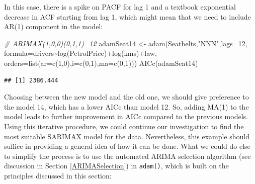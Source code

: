 \documentclass[
]{book}
\newenvironment{Shaded}{\begin{snugshade}}{\end{snugshade}}
\newcommand{\AttributeTok}[1]{\textcolor[rgb]{0.77,0.63,0.00}{#1}}
\newcommand{\CommentTok}[1]{\textcolor[rgb]{0.56,0.35,0.01}{\textit{#1}}}
\newcommand{\ConstantTok}[1]{\textcolor[rgb]{0.00,0.00,0.00}{#1}}
\newcommand{\DecValTok}[1]{\textcolor[rgb]{0.00,0.00,0.81}{#1}}
\newcommand{\FunctionTok}[1]{\textcolor[rgb]{0.00,0.00,0.00}{#1}}
\newcommand{\NormalTok}[1]{#1}
\newcommand{\OtherTok}[1]{\textcolor[rgb]{0.56,0.35,0.01}{#1}}
\newcommand{\SpecialCharTok}[1]{\textcolor[rgb]{0.00,0.00,0.00}{#1}}
\newcommand{\StringTok}[1]{\textcolor[rgb]{0.31,0.60,0.02}{#1}}
\theoremstyle{definition}
\theoremstyle{definition}
\theoremstyle{definition}
\theoremstyle{definition}
\theoremstyle{remark}
\begin{document}
In this case, there is a spike on PACF for lag 1 and a textbook exponential decrease in ACF starting from lag 1, which might mean that we need to include AR(1) component in the model:

\begin{Shaded}
\begin{Highlighting}[]
\CommentTok{\# ARIMAX(1,0,0)(0,1,1)\_12}
\NormalTok{adamSeat14 }\OtherTok{\textless{}{-}} \FunctionTok{adam}\NormalTok{(Seatbelts,}\StringTok{"NNN"}\NormalTok{,}\AttributeTok{lags=}\DecValTok{12}\NormalTok{,}
                   \AttributeTok{formula=}\NormalTok{drivers}\SpecialCharTok{\textasciitilde{}}\FunctionTok{log}\NormalTok{(PetrolPrice)}\SpecialCharTok{+}\FunctionTok{log}\NormalTok{(kms)}\SpecialCharTok{+}\NormalTok{law,}
                   \AttributeTok{orders=}\FunctionTok{list}\NormalTok{(}\AttributeTok{ar=}\FunctionTok{c}\NormalTok{(}\DecValTok{1}\NormalTok{,}\DecValTok{0}\NormalTok{),}\AttributeTok{i=}\FunctionTok{c}\NormalTok{(}\DecValTok{0}\NormalTok{,}\DecValTok{1}\NormalTok{),}\AttributeTok{ma=}\FunctionTok{c}\NormalTok{(}\DecValTok{0}\NormalTok{,}\DecValTok{1}\NormalTok{)))}
\FunctionTok{AICc}\NormalTok{(adamSeat14)}
\end{Highlighting}
\end{Shaded}

\begin{verbatim}
## [1] 2386.444
\end{verbatim}

Choosing between the new model and the old one, we should give preference to the model 14, which has a lower AICc than model 12. So, adding MA(1) to the model leads to further improvement in AICc compared to the previous models. Using this iterative procedure, we could continue our investigation to find the most suitable SARIMAX model for the data. Nevertheless, this example should suffice in providing a general idea of how it can be done. What we could do else to simplify the process is to use the automated ARIMA selection algorithm (see discussion in Section \ref{ARIMASelection}) in \texttt{adam()}, which is built on the principles discussed in this section:

\begin{Shaded}
\end{Shaded}
\end{document}
